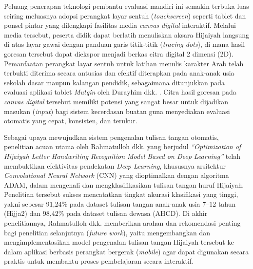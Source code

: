 \documentclass[conference]{IEEEtran}
\begin{document}
Peluang penerapan teknologi pembantu evaluasi mandiri ini semakin terbuka luas seiring meluasnya adopsi perangkat layar sentuh (\textit{touchscreen}) seperti tablet dan ponsel pintar yang dilengkapi fasilitas media \textit{canvas digital} interaktif. Melalui media tersebut, peserta didik dapat berlatih menuliskan aksara Hijaiyah langsung di atas layar gawai dengan panduan garis titik-titik (\textit{tracing dots}), di mana hasil goresan tersebut dapat diekspor menjadi berkas citra digital 2 dimensi (2D). Pemanfaatan perangkat layar sentuh untuk latihan menulis karakter Arab telah terbukti diterima secara antusias dan efektif diterapkan pada anak-anak usia sekolah dasar maupun kalangan pendidik, sebagaimana ditunjukkan pada evaluasi aplikasi tablet \textit{Mutqin} oleh Durayhim dkk. \cite{durayhim2023}. Citra hasil goresan pada \textit{canvas digital} tersebut memiliki potensi yang sangat besar untuk dijadikan masukan (\textit{input}) bagi sistem kecerdasan buatan guna menyediakan evaluasi otomatis yang cepat, konsisten, dan terukur.

Sebagai upaya mewujudkan sistem pengenalan tulisan tangan otomatis, penelitian acuan utama oleh Rahmatulloh dkk. \cite{rahmatulloh2022} yang berjudul \textit{``Optimization of Hijaiyah Letter Handwriting Recognition Model Based on Deep Learning''} telah membuktikan efektivitas pendekatan \textit{Deep Learning}, khususnya arsitektur \textit{Convolutional Neural Network} (CNN) yang dioptimalkan dengan algoritma ADAM, dalam mengenali dan mengklasifikasikan tulisan tangan huruf Hijaiyah. Penelitian tersebut sukses mencatatkan tingkat akurasi klasifikasi yang tinggi, yakni sebesar 91{,}24\% pada dataset tulisan tangan anak-anak usia 7--12 tahun (Hijja2) dan 98{,}42\% pada dataset tulisan dewasa (AHCD). Di akhir penelitiannya, Rahmatulloh dkk. \cite{rahmatulloh2022} memberikan arahan dan rekomendasi penting bagi penelitian selanjutnya (\textit{future work}), yaitu mengembangkan dan mengimplementasikan model pengenalan tulisan tangan Hijaiyah tersebut ke dalam aplikasi berbasis perangkat bergerak (\textit{mobile}) agar dapat digunakan secara praktis untuk membantu proses pembelajaran secara interaktif.
\end{document}
